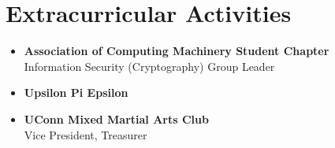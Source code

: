 \documentclass[10pt]{article}
\begin{document}
\section*{Extracurricular Activities}
\begin{itemize}

\item {\bf Association of Computing Machinery Student Chapter}\\
\quad Information Security (Cryptography) Group Leader

\item {\bf Upsilon Pi Epsilon}

\item {\bf UConn Mixed Martial Arts Club}\\
\quad Vice President, Treasurer

\end{itemize}
\end{document}
